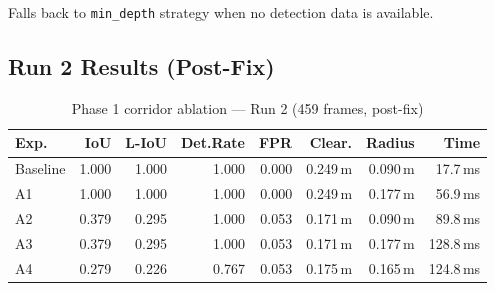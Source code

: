 \documentclass[11pt,a4paper]{article}
\begin{document}
Falls back to \texttt{min\_depth} strategy when no detection data is available.

\subsection{Run 2 Results (Post-Fix)}

\begin{table}[h]
\centering
\caption{Phase 1 corridor ablation --- Run 2 (459 frames, post-fix)}
\label{tab:phase1-run2}
\begin{tabular}{lrrrrrrr}
\toprule
\textbf{Exp.} & \textbf{IoU} & \textbf{L-IoU} & \textbf{Det.Rate} & \textbf{FPR} & \textbf{Clear.} & \textbf{Radius} & \textbf{Time} \\
\midrule
Baseline & 1.000 & 1.000 & 1.000 & 0.000 & 0.249\,m & 0.090\,m & 17.7\,ms \\
A1       & 1.000 & 1.000 & 1.000 & 0.000 & 0.249\,m & 0.177\,m & 56.9\,ms \\
A2       & 0.379 & 0.295 & 1.000 & 0.053 & 0.171\,m & 0.090\,m & 89.8\,ms \\
A3       & 0.379 & 0.295 & 1.000 & 0.053 & 0.171\,m & 0.177\,m & 128.8\,ms \\
A4       & 0.279 & 0.226 & 0.767 & 0.053 & 0.175\,m & 0.165\,m & 124.8\,ms \\
\bottomrule
\end{tabular}
\end{table}
\end{document}
